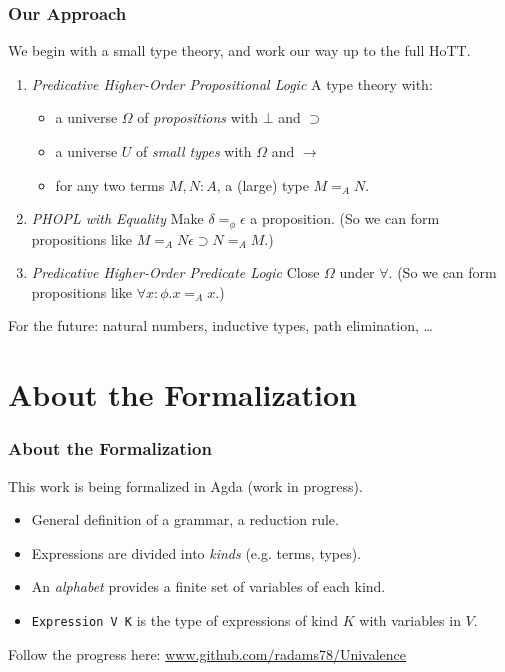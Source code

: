 \begin{frame}
\frametitle{Our Approach}
We begin with a small type theory, and work our way up to the full HoTT. %
\begin{enumerate}
\item \emph{Predicative Higher-Order Propositional Logic} A type theory with:
  \begin{itemize}
  \item a universe $\Omega$ of \emph{propositions} with $\bot$ and $\supset$
  \item a universe $U$ of \emph{small types} with $\Omega$ and $\rightarrow$
  \item for any two terms $M, N : A$, a (large) type $M =_A N$.
  \end{itemize}
\item \emph{PHOPL with Equality}
Make $\delta =_\phi \epsilon$ a proposition.  (So we can form propositions like $M =_A N \epsilon \supset N =_A M$.)
\item \emph{Predicative Higher-Order Predicate Logic} Close $\Omega$ under $\forall$.  (So we can form propositions like $\forall x : \phi. x =_A x$.)
\end{enumerate}
For the future: natural numbers, inductive types, path elimination, \ldots
\end{frame}

\section{About the Formalization}

\begin{frame}
\frametitle{About the Formalization}
This work is being formalized in Agda (work in progress).

\begin{itemize}
\item
General definition of a grammar, a reduction rule.
\item
Expressions are divided into \emph{kinds} (e.g. terms, types).
\item
An \emph{alphabet} provides a finite set of variables of each kind.
\item
\texttt{Expression V K} is the type of expressions of kind $K$ with variables in $V$.
\end{itemize}

Follow the progress here: \url{www.github.com/radams78/Univalence}
\end{frame}





